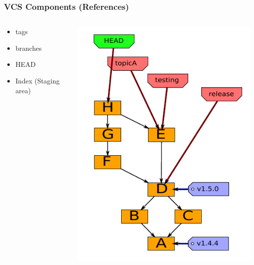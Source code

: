 \documentclass[english,compress]{beamer}
\begin{document}
\frame
{
    \frametitle{VCS Components (References)}

    \begin{columns}
        \begin{column}{.5\textwidth}
    \begin{itemize}
        \item tags
        \item branches
        \item HEAD
        \item Index (Staging area)
    \end{itemize}
\end{column}
\begin{column}{.5\textwidth}
    \includegraphics[width=\textwidth]{figs/references.png}
\end{column}
\end{columns}
}
\end{document}
